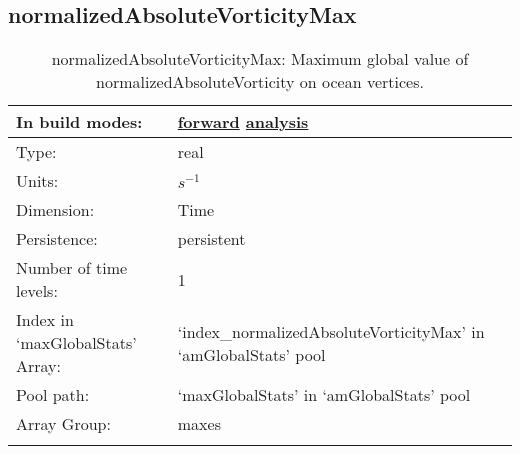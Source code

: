 \subsection[normalizedAbsoluteVorticityMax]{normalizedAbsoluteVorticityMax}
\label{subsec:var_sec_amGlobalStats_normalizedAbsoluteVorticityMax}
\begin{center}
\begin{longtable}{| p{2.0in} | p{4.0in} |}
        \hline 
        In build modes: & \hyperref[subsec:forward_var_tab_amGlobalStats]{forward} \hyperref[subsec:analysis_var_tab_amGlobalStats]{analysis} \\
        \hline 
        Type: & real \\
        \hline 
        Units: & $s^{-1}$ \\
        \hline 
        Dimension: & Time \\
        \hline 
        Persistence: & persistent \\
        \hline 
        Number of time levels: & 1 \\
        \hline 
		 Index in `maxGlobalStats' Array: & `index\_normalizedAbsoluteVorticityMax' in `amGlobalStats' pool \\
		 \hline 
            Pool path: & `maxGlobalStats' in `amGlobalStats' pool \\
		 \hline 
		 Array Group: & maxes \\
		 \hline 
    \caption{normalizedAbsoluteVorticityMax: Maximum global value of normalizedAbsoluteVorticity on ocean vertices.}
\end{longtable}
\end{center}
